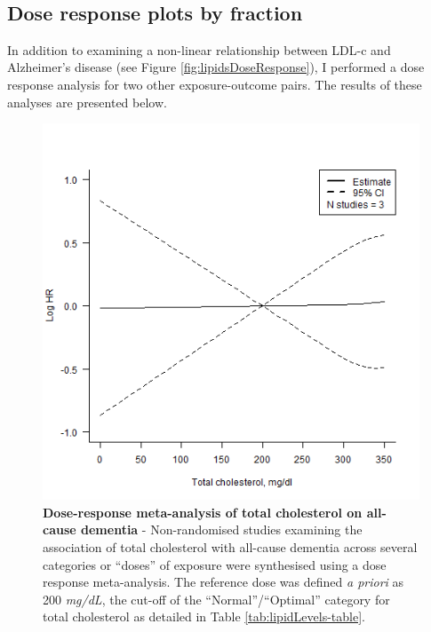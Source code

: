 \documentclass[a4paper, twoside]{templates/ociamthesis}
\begin{document}
~

\hypertarget{appendix-dr-fraction}{%
\subsection{Dose response plots by fraction}\label{appendix-dr-fraction}}

In addition to examining a non-linear relationship between LDL-c and Alzheimer's disease (see Figure \ref{fig:lipidsDoseResponse}), I performed a dose response analysis for two other exposure-outcome pairs. The results of these analyses are presented below.





\begin{figure}[H]

{\centering \includegraphics[width=0.6\linewidth]{figures/sys-rev/dr_Dementia_TC} 

}

\caption[Dose-response meta-analysis of total cholesterol on all-cause dementia]{\textbf{Dose-response meta-analysis of total cholesterol on all-cause dementia} - Non-randomised studies examining the association of total cholesterol with all-cause dementia across several categories or ``doses'' of exposure were synthesised using a dose response meta-analysis. The reference dose was defined \emph{a priori} as 200 \emph{mg/dL}, the cut-off of the ``Normal''/``Optimal'' category for total cholesterol as detailed in Table \ref{tab:lipidLevels-table}.}\label{fig:drDemeniaTC}
\end{figure}
\end{document}
